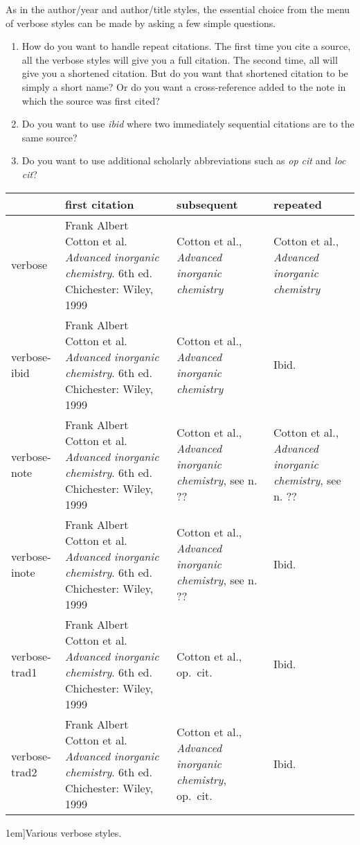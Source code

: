 As in the author/year and author/title styles, the essential choice
from the menu of verbose styles can be made by asking a few simple
questions.
\begin{enumerate}
\item How do you want to handle repeat citations. The first time you
  cite a source, all the verbose styles will give you a full
  citation. The second time, all will give you a shortened
  citation. But do you want that shortened citation to be simply a
  short name? Or do you want a cross-reference added to the note in
  which the source was first cited?
\item Do you want to use \emph{ibid} where two immediately sequential
  citations are to the same source?
\item Do you want to use additional scholarly abbreviations such as
  \emph{op cit} and \emph{loc cit}?
\end{enumerate}

\begin{table*}[btp]
\small
\begin{tabular}{lp{1.7in}p{1.7in}p{1.7in}}
\toprule
                                               & \textsf{first citation} & \textsf{subsequent} & 
\textsf{repeated}                                      \\
\midrule verbose                               & Frank Albert Cotton et al. \emph{Advanced inorganic
  chemistry}. 6th ed. Chichester: Wiley, 1999  & Cotton et al.,
\emph{Advanced inorganic chemistry}            & Cotton et al., \emph{Advanced
  inorganic chemistry}                                 \\
verbose-ibid                                   & Frank Albert Cotton et al. \emph{Advanced inorganic
  chemistry}. 6th ed. Chichester: Wiley, 1999  & Cotton et al.,
\emph{Advanced inorganic chemistry}            & Ibid. \\
verbose-note                                   & Frank Albert Cotton et al. \emph{Advanced inorganic
  chemistry}. 6th ed. Chichester: Wiley, 1999  & Cotton et al.,
\emph{Advanced inorganic chemistry}, see n. ?? & Cotton et al.,
\emph{Advanced inorganic chemistry}, see n. ??         \\
verbose-inote                                  & Frank Albert Cotton et al. \emph{Advanced inorganic
  chemistry}. 6th ed. Chichester: Wiley, 1999  & Cotton et al.,
\emph{Advanced inorganic chemistry}, see n. ?? & Ibid. \\
verbose-trad1                                  & Frank Albert Cotton et al. \emph{Advanced inorganic
  chemistry}. 6th ed. Chichester: Wiley, 1999  & Cotton et al.,
op.\ cit.                                      & Ibid. \\
verbose-trad2                                  & Frank Albert Cotton et al. \emph{Advanced inorganic
  chemistry}. 6th ed. Chichester: Wiley, 1999  & Cotton et al.,
\emph{Advanced inorganic chemistry},
op.\ cit.                                      & Ibid. \\
\bottomrule
\end{tabular}
\caption[][1em]{Various verbose styles.\label{bibliography:examples:verbose}}
\end{table*}

